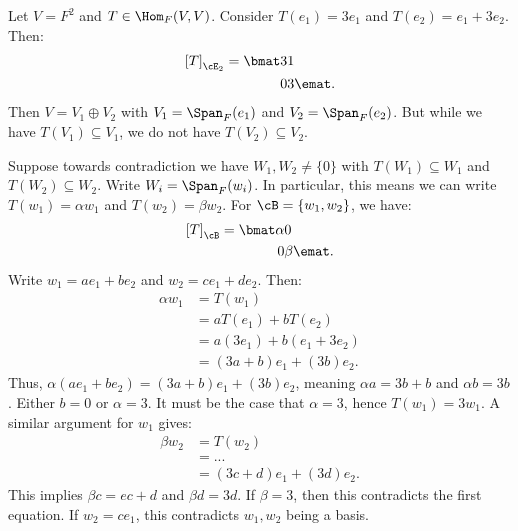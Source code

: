     \begin{example}
        Let $V = F^2$ and $T \in \Hom_F{(V,V)}$. Consider $T(e_1) = 3e_1$ and $T(e_2) = e_1 + 3e_2$. Then:
            \begin{equation*}
            \begin{split}
                \left[T\right]_{\cE_2} = \bmat 3 & 1 \\ 0 & 3 \emat.
            \end{split}
            \end{equation*}
        Then $V = V_1 \oplus V_2$ with $V_1 = \Span_F(e_1)$ and $V_2 = \Span_F{(e_2)}$. But while we have $T(V_1) \subseteq V_1$, we do not have $T(V_2) \subseteq V_2$.

        Suppose towards contradiction we have $W_1,W_2 \neq \{0\}$ with $T(W_1) \subseteq W_1$ and $T(W_2) \subseteq W_2$. Write $W_i = \Span_F{(w_i)}$. In particular, this means we can write $T(w_1) = \alpha w_1$ and $T(w_2) = \beta w_2$. For $\cB = \{w_1,w_2\}$, we have:
            \begin{equation*}
            \begin{split}
                \left[T\right]_\cB = \bmat \alpha & 0 \\ 0 & \beta \emat.
            \end{split}
            \end{equation*}
        Write $w_1 = ae_1 + be_2$ and $w_2 = ce_1 + de_2$. Then:
            \begin{equation*}
            \begin{split}
                \alpha w_1
                & = T(w_1) \\
                & = aT(e_1) + bT(e_2) \\
                & = a(3e_1) + b (e_1 + 3e_2) \\
                & = (3a+b)e_1 + (3b)e_2.
            \end{split}
            \end{equation*}
        Thus, $\alpha(ae_1 + be_2) = (3a+b)e_1 + (3b) e_2$, meaning $\alpha a = 3b+b$ and $\alpha b = 3b$. Either $b = 0$ or $\alpha = 3$. It must be the case that $\alpha = 3$, hence $T(w_1) = 3w_1$. A similar argument for $w_1$ gives:
            \begin{equation*}
            \begin{split}
                \beta w_2
                & = T(w_2) \\
                & = ... \\
                & = (3c+d)e_1 + (3d)e_2.
            \end{split}
            \end{equation*}
        This implies $\beta c = ec + d$ and $\beta d = 3d$. If $\beta = 3$, then this contradicts the first equation. If $w_2 = ce_1$, this contradicts $w_1,w_2$ being a basis.
    \end{example}

